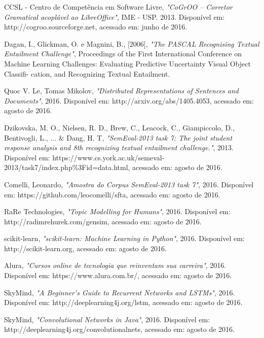 \documentclass[conference]{IEEEtran}
\begin{document}
\begin{thebibliography}{1}
CCSL - Centro de Competência em Software Livre, \emph{"CoGrOO – Corretor Gramatical acoplável ao LibreOffice"}, IME - USP. 2013. Disponível em: http://cogroo.sourceforge.net, acessado em: junho de 2016.

Dagan, I., Glickman, O. e Magnini, B., [2006], \emph{"The PASCAL Recognising Textual Entailment Challenge"}, Proceedings of the First International Conference on Machine
Learning Challenges: Evaluating Predictive Uncertainty Visual Object Classifi-
cation, and Recognizing Textual Entailment.

Quoc V. Le, Tomas Mikolov, \emph{"Distributed Representations of Sentences and Documents"}, 2016. Disponível em: http://arxiv.org/abs/1405.4053, acessado em: agosto de 2016.

Dzikovska, M. O., Nielsen, R. D., Brew, C., Leacock, C., Giampiccolo, D.,
Bentivogli, L., ... \& Dang, H. T, \emph{"SemEval-2013 task 7: The joint student response analysis and 8th recognizing textual entailment challenge."}, 2013. Disponível em: https://www.cs.york.ac.uk/semeval-2013/task7/index.php\%3Fid=data.html, acessado em: agosto de 2016.

Comelli, Leonardo, \emph{"Amostra do Corpus SemEval-2013 task 7"}, 2016. Disponível em: https://github.com/leocomelli/sfta, acessado em: agosto de 2016.

RaRe Technologies, \emph{"Topic Modelling for Humans"}, 2016. Disponível em: http://radimrehurek.com/gensim, acessado em: agosto de 2016.

scikit-learn, \emph{"scikit-learn: Machine Learning in Python"}, 2016. Disponível em: http://scikit-learn.org, acessado em: agosto de 2016.

Alura, \emph{"Cursos online de tecnologia que reinventam sua carreira"}, 2016. Disponível em: https://www.alura.com.br/, acessado em: agosto de 2016.

SkyMind, \emph{"A Beginner’s Guide to Recurrent Networks and LSTMs"}, 2016. Disponível em: http://deeplearning4j.org/lstm, acessado em: agosto de 2016.

SkyMind, \emph{"Convolutional Networks in Java"}, 2016. Disponível em: http://deeplearning4j.org/convolutionalnets, acessado em: agosto de 2016.

\end{thebibliography}
\end{document}
